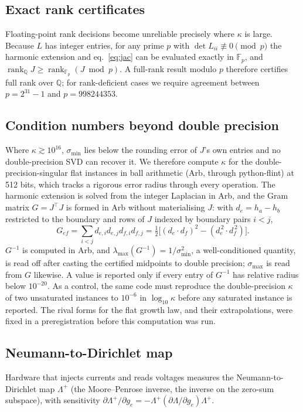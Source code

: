 \documentclass[11pt,a4paper]{article}
\newcommand{\F}{\mathbb{F}}
\begin{document}
\subsection{Exact rank certificates}
Floating-point rank decisions become unreliable precisely where $\kappa$ is large. Because $L$ has integer
entries, for any prime $p$ with $\det L_{ii}\not\equiv 0 \pmod p$ the harmonic extension and eq.~\eqref{eq:jac} can
be evaluated exactly in $\F_p$, and $\operatorname{rank}_{\mathbb{Q}} J \ge \operatorname{rank}_{\F_p}(J \bmod p)$.
A full-rank result modulo $p$ therefore certifies full rank over $\mathbb Q$; for rank-deficient cases we require
agreement between $p=2^{31}-1$ and $p=998244353$.

\subsection{Condition numbers beyond double precision}
\label{sec:arb}
Where $\kappa\gtrsim10^{16}$, $\sigma_{\min}$ lies below the rounding error of $J$'s own entries and no
double-precision SVD can recover it. We therefore compute $\kappa$ for the double-precision-singular flat instances
in ball arithmetic (Arb, through python-flint) at 512 bits, which tracks a rigorous error radius through every
operation. The harmonic extension is solved from the integer Laplacian in Arb, and the Gram matrix $G=J^\top J$ is
formed in Arb without materialising $J$: with $d_e = h_a-h_b$ restricted to the boundary and rows of $J$ indexed by
boundary pairs $i<j$,
\begin{equation}
G_{ef}=\sum_{i<j} d_{e,i}d_{e,j}d_{f,i}d_{f,j}=\tfrac12\big[(d_e\!\cdot\! d_f)^2-(d_e^{\,2}\!\cdot\! d_f^{\,2})\big].
\end{equation}
$G^{-1}$ is computed in Arb, and $\lambda_{\max}(G^{-1})=1/\sigma_{\min}^2$, a well-conditioned quantity, is read
off after casting the certified midpoints to double precision; $\sigma_{\max}$ is read from $G$ likewise. A value is
reported only if every entry of $G^{-1}$ has relative radius below $10^{-20}$. As a control, the same code must
reproduce the double-precision $\kappa$ of two unsaturated instances to $10^{-6}$ in $\log_{10}\kappa$ before any
saturated instance is reported. The rival forms for the flat growth law, and their extrapolations, were fixed in a
preregistration before this computation was run.

\subsection{Neumann-to-Dirichlet map}
Hardware that injects currents and reads voltages measures the Neumann-to-Dirichlet map $\Lambda^{+}$ (the
Moore--Penrose inverse, the inverse on the zero-sum subspace), with sensitivity
$\partial\Lambda^{+}/\partial g_e = -\Lambda^{+}(\partial\Lambda/\partial g_e)\Lambda^{+}$.
\end{document}

